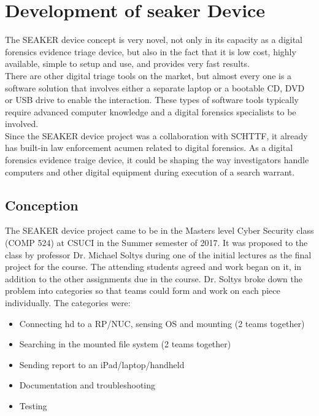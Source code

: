 \documentclass[12pt]{article}
\begin{document}
\section{Development of \gls{seaker} Device}
\label{sect-developmentSeakerDevice}

The SEAKER device concept is very novel, not only in its capacity as a digital 
forensics evidence triage device, but also in the fact that it is low cost, highly
available, simple to setup and use, and provides very fast results.\\

There are other digital triage tools on the market, but almost every one is a
software solution that involves either a separate laptop or a bootable
CD, DVD or USB drive to enable the interaction.  These types of software tools
typically require advanced computer knowledge and a digital forensics specialists
to be involved.\\

Since the SEAKER device project was a collaboration with SCHTTF, it already has
built-in law enforcement acumen related to digital forensics.  As a digital
forensics evidence traige device, it could be shaping the way investigators
handle computers and other digital equipment during execution of a search warrant.\\

\subsection{Conception}

The SEAKER device project came to be in the Masters level Cyber Security class (COMP 524)
at CSUCI in the Summer semester of 2017.  It was proposed to the class by professor 
Dr. Michael Soltys during one of the initial lectures as the final project for the
course.  The attending students agreed and work began on it, in addition to the other
assignments due in the course.  Dr. Soltys broke down the problem into categories so
that teams could form and work on each piece individually.  The categories were:

\begin{itemize}
  \item Connecting hd to a RP/NUC, sensing OS and mounting (2 teams together)
  \item Searching in the mounted file system (2 teams together)
  \item Sending report to an iPad/laptop/handheld
  \item Documentation and troubleshooting
  \item Testing
\end{itemize}
\end{document}
